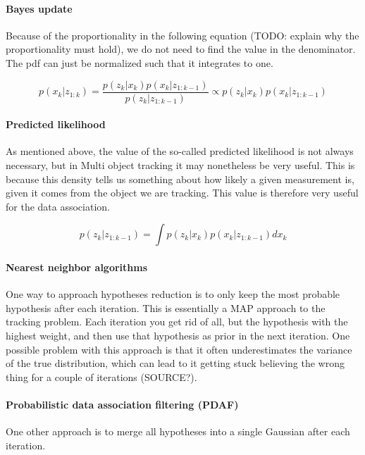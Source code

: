 \paragraph{Bayes update}
Because of the proportionality in the following equation (TODO: explain why the proportionality must hold), we do not need to find the value in the denominator. The pdf can just be normalized such that it integrates to one.

\begin{equation}
    p(x_k \vert z_{1:k}) = \frac{p(z_k \vert x_k) p(x_k \vert z_{1:k-1})}{p(z_k \vert z_{1:k-1})} \propto p(z_k \vert x_k) p(x_k \vert z_{1:k-1})
\end{equation}

\paragraph{Predicted likelihood}

As mentioned above, the value of the so-called predicted likelihood is not always necessary, but in Multi object tracking it may nonetheless be very useful. This is because this density tells us something about how likely a given measurement is, given it comes from the object we are tracking. This value is therefore very useful for the data association.

\begin{equation}
    p(z_k \vert z_{1:k-1}) = \int p(z_k \vert x_k) p(x_k \vert z_{1:k-1}) dx_k
\end{equation}

\paragraph{Nearest neighbor algorithms}
One way to approach hypotheses reduction is to only keep the most probable hypothesis after each iteration. This is essentially a MAP approach to the tracking problem. Each iteration you get rid of all, but the hypothesis with the highest weight, and then use that hypothesis as prior in the next iteration. One possible problem with this approach is that it often underestimates the variance of the true distribution, which can lead to it getting stuck believing the wrong thing for a couple of iterations (SOURCE?).

\paragraph{Probabilistic data association filtering (PDAF)}
One other approach is to merge all hypotheses into a single Gaussian after each iteration. 

